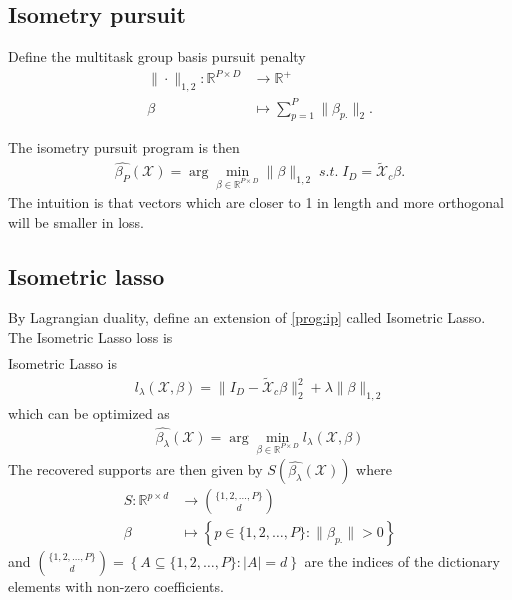 \documentclass[a4paper,11pt]{article}
\begin{document}
\subsection{Isometry pursuit}

Define the multitask group basis pursuit penalty %
\begin{align}
\label{eq:bp}
\| \cdot \|_{1,2}: \mathbb R^{P \times D} &\to \mathbb R^+ \\ 
\beta &\mapsto  \sum_{p=1}^P  \|\beta_{p.}\|_2.
\end{align}

The isometry pursuit program is then
\begin{align}
\label{prog:isometry_pursuit}
\hat {\beta_{P}} (\mathcal X)  = \arg \min_{\beta \in \mathbb R^{P \times D}} \| \beta \|_{1,2} \; s.t. \; I_D = \tilde{ \mathcal X}_c \beta.
\end{align}
The intuition is that vectors which are closer to 1 in length and more orthogonal will be smaller in loss.



\subsection{Isometric lasso}

By Lagrangian duality, define an extension of \ref{prog:ip} called Isometric Lasso.
The Isometric Lasso loss is
\begin{align}
\end{align}
Isometric Lasso is
\begin{align}
l_\lambda (\mathcal X, \beta) =  \|I_D -  \tilde{ \mathcal X}_c \beta\|_2^2 +  \lambda \| \beta \|_{1,2}
\end{align}
which can be optimized as
\begin{align}
\label{prog:isometric_lasso}
\hat {\beta_{\lambda}} (\mathcal X) = \arg \min_{\beta \in \mathbb R^{P \times D}} l_\lambda (\mathcal X, \beta)
\end{align}
The recovered supports are then given by $S(\hat {\beta_{\lambda}} (\mathcal X))$ where 
\begin{align}
S: \mathbb{R}^{p \times d} &\to \binom{\{1, 2, \ldots, P\}}{d} \\
\beta &\mapsto \left\{ p \in \{1, 2, \ldots, P\} :  \|\beta_{p.}\| > 0 \right\}
\end{align}
and $\binom{\{1, 2, \ldots, P\}}{d} = \left\{ A \subseteq \{1, 2, \ldots, P\} : \left|A\right| = d \right\}$ are the indices of the dictionary elements with non-zero coefficients.
\end{document}

